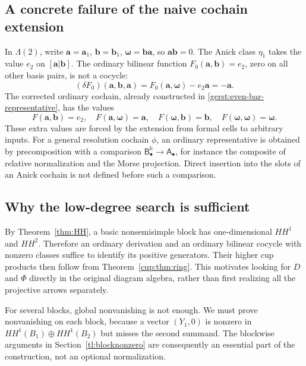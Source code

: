 \documentclass[a4paper,11pt,oneside,reqno]{amsart}
\theoremstyle{definition}
\numberwithin{equation}{section}
\begin{document}
	\subsection{A concrete failure of the naive cochain extension}
	In $\Lambda(2)$, write $\mathbf{a}=\mathbf{a}_1$, $\mathbf{b}=\mathbf{b}_1$, $\boldsymbol{\omega}=\mathbf{b}\mathbf{a}$, so $\mathbf{a}\mathbf{b}=0$.
	The Anick class $\eta_1$ takes the value $e_2$ on $\mathsf{[\mathbf{a}|\mathbf{b}]}$.
	The ordinary bilinear function $F_0(\mathbf{a},\mathbf{b})=e_2$, zero on all other
	basis pairs, is not a cocycle:
	\[
	(\delta F_0)(\mathbf{a},\mathbf{b},\mathbf{a})=F_0(\mathbf{a},\boldsymbol{\omega})-e_2\mathbf{a}=-\mathbf{a}.
	\]
	The corrected ordinary cochain, already constructed in
	\eqref{gerst:even-bar-representative}, has the values
	\[
	F(\mathbf{a},\mathbf{b})=e_2,\quad F(\mathbf{a},\boldsymbol{\omega})=\mathbf{a},\quad F(\boldsymbol{\omega},\mathbf{b})=\mathbf{b},\quad F(\boldsymbol{\omega},\boldsymbol{\omega})=\boldsymbol{\omega}.
	\]
	These extra values are forced by the extension from formal cells to
	arbitrary inputs.  For a general resolution cochain $\phi$, an ordinary
	representative is obtained by precomposition with a comparison
	$\mathsf B^{\Bbbk}_\bullet\to\mathsf A_\bullet$, for instance the composite of relative
	normalization and the Morse projection.  Direct insertion into the
	slots of an Anick cochain is not defined before such a comparison.
	
	\subsection{Why the low-degree search is sufficient}
	By Theorem~\ref{thm:HH}, a basic nonsemisimple block has one-dimensional
	$HH^1$ and $HH^2$.  Therefore an ordinary derivation and an ordinary
	bilinear cocycle with nonzero classes suffice to identify its positive
	generators.  Their higher cup products then follow from
	Theorem~\ref{cup:thm:ring}.  This motivates looking for $D$ and $\Phi$
	directly in the original diagram algebra, rather than first realizing
	all the projective arrows separately.
	
	For several blocks, global nonvanishing is not enough.  We must prove
	nonvanishing on each block, because a vector $(Y_1,0)$ is nonzero in
	$HH^1(B_1)\oplus HH^1(B_2)$ but misses the second summand.  The
	blockwise arguments in Section~\ref{tl:blocknonzero} are consequently
	an essential part of the construction, not an optional normalization.
	
\end{document}
